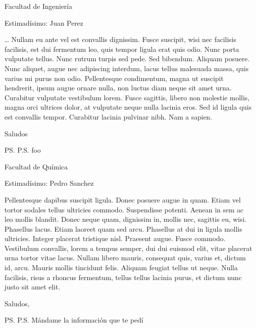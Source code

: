 \documentclass{letter}
\begin{document}
  \begin{letter}{Facultad de Ingeniería}
    \opening{Estimadísimo: Juan Perez}
    \dots
    Nullam eu ante vel est convallis dignissim.  Fusce suscipit, wisi nec
    facilisis facilisis, est dui fermentum leo, quis tempor ligula erat quis
    odio.  Nunc porta vulputate tellus.  Nunc rutrum turpis sed pede.  Sed
    bibendum.  Aliquam posuere.  Nunc aliquet, augue nec adipiscing interdum,
    lacus tellus malesuada massa, quis varius mi purus non odio.  Pellentesque
    condimentum, magna ut suscipit hendrerit, ipsum augue ornare nulla, non
    luctus diam neque sit amet urna.  Curabitur vulputate vestibulum lorem.
    Fusce sagittis, libero non molestie mollis, magna orci ultrices dolor, at
    vulputate neque nulla lacinia eros.  Sed id ligula quis est convallis
    tempor.  Curabitur lacinia pulvinar nibh.  Nam a sapien.
    \closing{Saludos}
    \ps{P.S. foo}
  \end{letter}
  \begin{letter}{Facultad de Química}
    \opening{Estimadísimo: Pedro Sanchez}
    Pellentesque dapibus suscipit ligula.  Donec posuere augue in quam.  Etiam
    vel tortor sodales tellus ultricies commodo.  Suspendisse potenti.  Aenean
    in sem ac leo mollis blandit.  Donec neque quam, dignissim in, mollis nec,
    sagittis eu, wisi.  Phasellus lacus.  Etiam laoreet quam sed arcu.
    Phasellus at dui in ligula mollis ultricies.  Integer placerat tristique
    nisl.  Praesent augue.  Fusce commodo.  Vestibulum convallis, lorem a tempus
    semper, dui dui euismod elit, vitae placerat urna tortor vitae lacus.
    Nullam libero mauris, consequat quis, varius et, dictum id, arcu.  Mauris
    mollis tincidunt felis.  Aliquam feugiat tellus ut neque.  Nulla facilisis,
    risus a rhoncus fermentum, tellus tellus lacinia purus, et dictum nunc justo
    sit amet elit.
    \closing{Saludos,}
    \ps{P.S. Mándame la información que te pedí}
  \end{letter}
\end{document}
